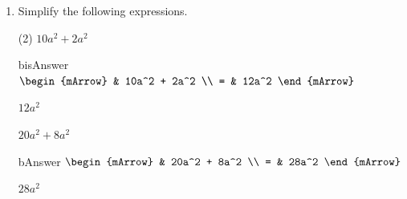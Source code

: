 \clearpage
\begin{enumerate}[resume]	
  \item Simplify the following expressions.
  \begin{subtask}(2)
    \task[]  $ 10a^2 + 2a^2  $
              \begin{envOut}[height=6cm]{bisAnswer}
			       $\begin{mArrow}
			                & 10a^2  + 2a^2       \\ 
                          = & 12a^2   
	                \end{mArrow}$
              \end{envOut}			  
			  \begin{exercise}\begin{shortsolution}  
				       $12a^2$
			  \end{shortsolution}\end{exercise}
			  
    \task[]  $ 20a^2  + 8a^2  $
              \begin{envOut}[height=6cm]{bAnswer}
			       $\begin{mArrow}
			                & 20a^2  + 8a^2       \\ 
                          = & 28a^2	  
	                \end{mArrow}$
              \end{envOut}			  
			  \begin{exercise}\begin{shortsolution}  
				       $28a^2$
			  \end{shortsolution}\end{exercise}			  
    \end{subtask}
\end{enumerate}




